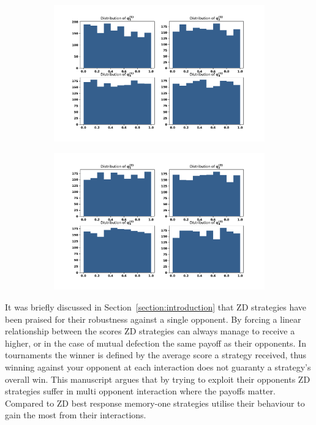 \documentclass[10pt]{article}
\begin{document}
\begin{figure}[!htbp]
    \begin{subfigure}{0.49\textwidth}
        \centering
        \includegraphics[width=\linewidth]{img/first_opponent_probabilities.pdf}
        \label{fig:first_opponents_probabilities}
    \end{subfigure}
    \begin{subfigure}{0.49\textwidth}
        \centering
        \includegraphics[width=\linewidth]{img/second_opponent_probabilities.pdf}
        \label{fig:second_opponents_probabilities}
    \end{subfigure}
\end{figure}

It was briefly discussed in Section~\ref{section:introduction} that ZD
strategies have been praised for their robustness against a single opponent. By
forcing a linear relationship between the scores ZD strategies can always manage
to receive a higher, or in the case of mutual defection the same payoff as their
opponents. In tournaments the winner is defined by the average score a strategy
received, thus winning against your opponent at each interaction does not
guaranty a strategy's overall win. This manuscript argues that by trying to
exploit their opponents ZD strategies suffer in multi opponent interaction where
the payoffs matter. Compared to ZD best response memory-one strategies utilise
their behaviour to gain the most from their interactions.
\end{document}
